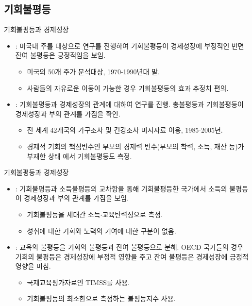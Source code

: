 \documentclass[handout, 10pt]{beamer}
\begin{document}
\subsection{기회불평등}
\begin{frame}{기회불평등과 경제성장}
    \begin{itemize}
        \item \cite{mnr13} : 미국내 주를 대상으로 연구를 진행하여 기회불평등이 경제성장에 부정적인 반면 잔여 불평등은 긍정적임을 보임.
        \begin{itemize}
            \item 미국의 50개 주가 분석대상, 1970-1990년대 말.
            \item 사람들의 자유로운 이동이 가능한 경우 기회불평등의 효과 추정치 편의.
        \end{itemize}
        \item \cite{fetl18} : 기회불평등과 경제성장의 관계에 대하여 연구를 진행. 총불평등과 기회불평등이 경제성장과 부의 관계를 가짐을 확인.
        \begin{itemize}
            \item 전 세계 42개국의 가구조사 및 건강조사 미시자료 이용, 1985-2005년.
            \item 경제적 기회의 핵심변수인 부모의 경제력 변수(부모의 학력, 소득, 재산 등)가 부재한 상태 에서 기회불평등도 측정.
        \end{itemize}
    \end{itemize}
\end{frame}

\begin{frame}{기회불평등과 경제성장}
    \begin{itemize}
        \item \cite{ane20} : 기회불평등과 소득불평등의 교차항을 통해 기회불평등한 국가에서 소득의 불평등이 경제성장과 부의 관계를 가짐을 보임.
        \begin{itemize}
            \item 기회불평등을 세대간 소득$\cdot$교육탄력성으로 측정.
            \item 성취에 대한 기회와 노력의 기여에 대한 구분이 없음.
        \end{itemize}
        \item \cite{kno17} : 교육의 불평등을 기회의 불평등과 잔여 불평등으로 분해. OECD 국가들의 경우 기회의 불평등은 경제성장에 부정적 영향을 주고 잔여 불평등은 경제성장에 긍정적 영향을 미침.
        \begin{itemize}
            \item 국제교육평가자료인 TIMSS를 사용.
            \item 기회불평등의 최소한으로 측정하는 불평등지수 사용.
        \end{itemize}
    \end{itemize}
\end{frame}
\end{document}
